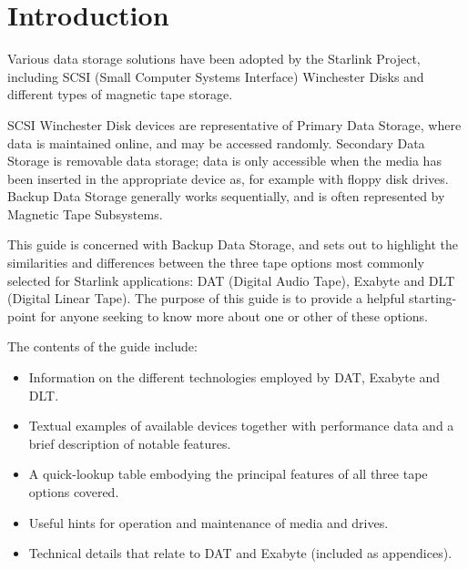  \begin{latexonly}
   \setlength{\parskip}{0mm}
   \latexonlytoc
   \setlength{\parskip}{\medskipamount}
   \markright{\stardocname}
 \end{latexonly}
\newpage
\renewcommand{\thepage}{\arabic{page}}
\setcounter{page}{1}

\section {Introduction}

Various data storage solutions have been adopted by the Starlink Project,
including SCSI (Small Computer Systems Interface) Winchester Disks and
different types of magnetic tape storage.

SCSI Winchester Disk devices are representative of Primary Data Storage,
where data is maintained online, and may be accessed randomly. Secondary
Data Storage is removable data storage; data is only accessible when the
media has been inserted in the appropriate device as, for example with
floppy disk drives. Backup Data Storage generally works sequentially, and is
often represented by Magnetic Tape Subsystems.

This guide is concerned with Backup Data Storage, and sets out to highlight
the similarities and differences between the three tape options most
commonly selected for Starlink applications: DAT (Digital Audio Tape),
Exabyte and DLT (Digital Linear Tape). The purpose of this guide is to
provide a helpful starting-point for anyone seeking to know more about one
or other of these options.

The contents of the guide include:

\begin {itemize}

\item Information on the different technologies employed by DAT, Exabyte and
DLT.

\item Textual examples of available devices together with performance data and
a brief description of notable features.

\item A quick-lookup table embodying the principal features of all three tape
options covered.

\item Useful hints for operation and maintenance of media and drives.

\item Technical details that relate to DAT and Exabyte (included as
appendices).

\end {itemize}

